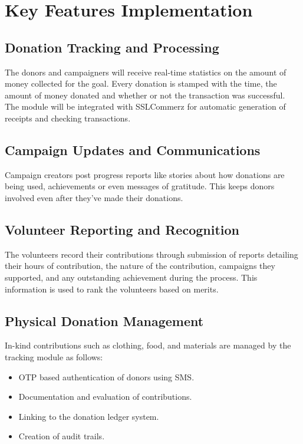 \documentclass{thesis-library}
\begin{document}
\section{Key Features Implementation}

\subsection{Donation Tracking and Processing}
The donors and campaigners will receive real-time statistics on the amount of money collected for the goal. Every donation is stamped with the time, the amount of money donated and whether or not the transaction was successful. The module will be integrated with SSLCommerz for automatic generation of receipts and checking transactions.

\subsection{Campaign Updates and Communications}
Campaign creators post progress reports like stories about how donations are being used, achievements or even messages of gratitude. This keeps donors involved even after they’ve made their donations.

\subsection{Volunteer Reporting and Recognition}
The volunteers record their contributions through submission of reports detailing their hours of contribution, the nature of the contribution, campaigns they supported, and any outstanding achievement during the process. This information is used to rank the volunteers based on merits.

\subsection{Physical Donation Management}
In-kind contributions such as clothing, food, and materials are managed by the tracking module as follows:
\begin{itemize}
    \item OTP based authentication of donors using SMS.
    \item Documentation and evaluation of contributions.
    \item Linking to the donation ledger system.
    \item Creation of audit trails.
\end{itemize}
\end{document}
